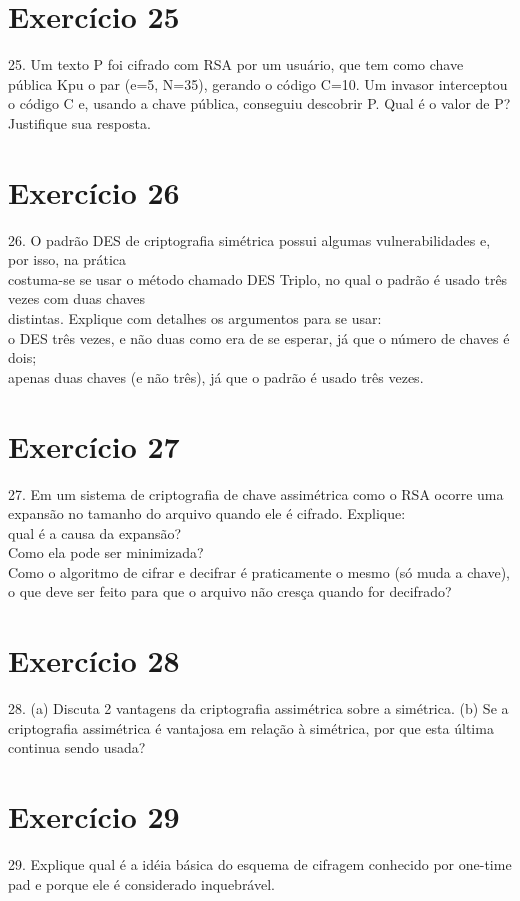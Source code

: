 \documentclass[10pt,a4paper]{article}
\begin{document}
\section*{Exercício 25}
25. Um texto P foi cifrado com RSA por um usuário, que tem como chave pública Kpu o par (e=5, N=35), gerando o código C=10. Um invasor interceptou o código C e, usando a chave pública, conseguiu descobrir P. Qual é o valor de P? Justifique sua resposta.\\
\section*{Exercício 26}
26. O padrão DES de criptografia simétrica possui algumas vulnerabilidades e, por isso, na prática\\ costuma-se se usar o método chamado DES Triplo, no qual o padrão é usado três vezes com duas chaves\\ distintas. Explique com detalhes os argumentos para se usar:\\
o DES três vezes, e não duas como era de se esperar, já que o número de chaves é dois;\\
apenas duas chaves (e não três), já que o padrão é usado três vezes.\\
\section*{Exercício 27}
27. Em um sistema de criptografia de chave assimétrica como o RSA ocorre uma expansão no tamanho do arquivo quando ele é cifrado. Explique:\\
qual é a causa da expansão?\\
Como ela pode ser minimizada?\\
Como o algoritmo de cifrar e decifrar é praticamente o mesmo (só muda a chave), o que deve ser feito para que o arquivo não cresça quando for decifrado?\\
\section*{Exercício 28}
28. (a) Discuta 2 vantagens da criptografia assimétrica sobre a simétrica.
(b) Se a criptografia assimétrica é vantajosa em relação à simétrica, por que esta última continua sendo usada?\\
\section*{Exercício 29}
29. Explique qual é a idéia básica do esquema de cifragem conhecido por one-time pad e porque ele é considerado inquebrável.
\end{document}
